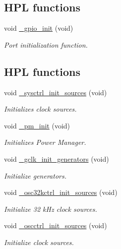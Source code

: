 \subsection*{H\+PL functions}
\begin{DoxyCompactItemize}
\item 
void \hyperlink{group___h_p_l_ga6e226919d4a3ee84599b55a32597e284}{\+\_\+gpio\+\_\+init} (void)
\begin{DoxyCompactList}\small\item\em Port initialization function. \end{DoxyCompactList}\end{DoxyCompactItemize}
\subsection*{H\+PL functions}
\begin{DoxyCompactItemize}
\item 
void \hyperlink{group___h_p_l_ga11bde7accfa853194b32dae4f27bad40}{\+\_\+sysctrl\+\_\+init\+\_\+sources} (void)
\begin{DoxyCompactList}\small\item\em Initializes clock sources. \end{DoxyCompactList}\item 
void \hyperlink{group___h_p_l_ga0e9b9fbf16506f0f6ad8e8b1aa87dc73}{\+\_\+pm\+\_\+init} (void)
\begin{DoxyCompactList}\small\item\em Initializes Power Manager. \end{DoxyCompactList}\item 
void \hyperlink{group___h_p_l_ga87e8c45b05aee8f3b453630134d3483d}{\+\_\+gclk\+\_\+init\+\_\+generators} (void)
\begin{DoxyCompactList}\small\item\em Initialize generators. \end{DoxyCompactList}\item 
void \hyperlink{group___h_p_l_gaab304aa890beb23e3311aaa2c0def527}{\+\_\+osc32kctrl\+\_\+init\+\_\+sources} (void)
\begin{DoxyCompactList}\small\item\em Initialize 32 k\+Hz clock sources. \end{DoxyCompactList}\item 
void \hyperlink{group___h_p_l_gaee0105b1dbc07a2ca23586aa95f49cc7}{\+\_\+oscctrl\+\_\+init\+\_\+sources} (void)
\begin{DoxyCompactList}\small\item\em Initialize clock sources. \end{DoxyCompactList}\item 

\end{DoxyCompactItemize}
